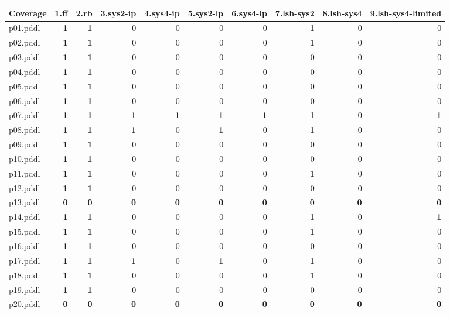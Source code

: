 \documentclass{article}
\begin{document}
\begin{tabular}{@{}lrrrrrrrrr@{}}
Coverage & 1.ff & 2.rb & 3.sys2-ip & 4.sys4-ip & 5.sys2-lp & 6.sys4-lp & 7.lsh-sys2 & 8.lsh-sys4 & 9.lsh-sys4-limited \\
\midrule
p01.pddl & \textbf{1} & \textbf{1} & 0 & 0 & 0 & 0 & \textbf{1} & 0 & 0 \\
p02.pddl & \textbf{1} & \textbf{1} & 0 & 0 & 0 & 0 & \textbf{1} & 0 & 0 \\
p03.pddl & \textbf{1} & \textbf{1} & 0 & 0 & 0 & 0 & 0 & 0 & 0 \\
p04.pddl & \textbf{1} & \textbf{1} & 0 & 0 & 0 & 0 & 0 & 0 & 0 \\
p05.pddl & \textbf{1} & \textbf{1} & 0 & 0 & 0 & 0 & 0 & 0 & 0 \\
p06.pddl & \textbf{1} & \textbf{1} & 0 & 0 & 0 & 0 & 0 & 0 & 0 \\
p07.pddl & \textbf{1} & \textbf{1} & \textbf{1} & \textbf{1} & \textbf{1} & \textbf{1} & \textbf{1} & 0 & \textbf{1} \\
p08.pddl & \textbf{1} & \textbf{1} & \textbf{1} & 0 & \textbf{1} & 0 & \textbf{1} & 0 & 0 \\
p09.pddl & \textbf{1} & \textbf{1} & 0 & 0 & 0 & 0 & 0 & 0 & 0 \\
p10.pddl & \textbf{1} & \textbf{1} & 0 & 0 & 0 & 0 & 0 & 0 & 0 \\
p11.pddl & \textbf{1} & \textbf{1} & 0 & 0 & 0 & 0 & \textbf{1} & 0 & 0 \\
p12.pddl & \textbf{1} & \textbf{1} & 0 & 0 & 0 & 0 & 0 & 0 & 0 \\
p13.pddl & \textbf{0} & \textbf{0} & \textbf{0} & \textbf{0} & \textbf{0} & \textbf{0} & \textbf{0} & \textbf{0} & \textbf{0} \\
p14.pddl & \textbf{1} & \textbf{1} & 0 & 0 & 0 & 0 & \textbf{1} & 0 & \textbf{1} \\
p15.pddl & \textbf{1} & \textbf{1} & 0 & 0 & 0 & 0 & \textbf{1} & 0 & 0 \\
p16.pddl & \textbf{1} & \textbf{1} & 0 & 0 & 0 & 0 & 0 & 0 & 0 \\
p17.pddl & \textbf{1} & \textbf{1} & \textbf{1} & 0 & \textbf{1} & 0 & \textbf{1} & 0 & 0 \\
p18.pddl & \textbf{1} & \textbf{1} & 0 & 0 & 0 & 0 & \textbf{1} & 0 & 0 \\
p19.pddl & \textbf{1} & \textbf{1} & 0 & 0 & 0 & 0 & 0 & 0 & 0 \\
p20.pddl & \textbf{0} & \textbf{0} & \textbf{0} & \textbf{0} & \textbf{0} & \textbf{0} & \textbf{0} & \textbf{0} & \textbf{0} \\
\end{tabular}
\end{document}
